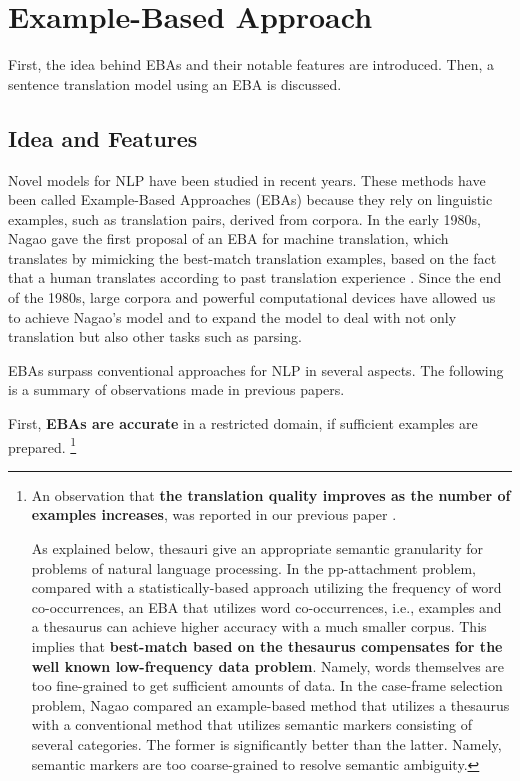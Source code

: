 \section{Example-Based Approach}\label{sec-outline}

First, the idea behind EBAs and their notable features are introduced. Then, 
a sentence translation model using an EBA is discussed.

\subsection{Idea and Features}\label{sec-feature}

Novel models for NLP have been studied in recent years.
These methods have been called Example-Based Approaches (EBAs)
because they rely
on linguistic examples, such as translation
pairs, derived from corpora.
In the early 1980s, Nagao gave the first proposal of an EBA
for machine translation, 
which  translates by mimicking 
the best-match translation examples,
based on the fact that  
a human translates according to
past translation experience \cite{Nagao84}.
Since the end of the 1980s, 
large corpora and powerful computational devices have allowed us to
achieve Nagao's model and to expand the model to deal with 
not only translation but also other tasks such as parsing.

EBAs surpass conventional approaches for NLP
in several aspects. 
The following is a summary of observations made in  previous papers.

First, {\bf EBAs are accurate} in a restricted domain, if sufficient examples
are prepared.
\footnote{
An observation that {\bf the translation quality improves as the number 
of examples increases}, was reported in our previous paper \cite{Sumita92b}.

As explained below, thesauri give an appropriate semantic granularity for 
problems of natural language processing.
In the pp-attachment problem, compared with a statistically-based approach 
utilizing the frequency of word co-occurrences, an EBA that utilizes 
word co-occurrences, i.e., examples and a thesaurus can achieve higher 
accuracy with a much smaller corpus.
This implies that {\bf best-match based on the thesaurus compensates for
the well known low-frequency data problem}. Namely, words themselves are too 
fine-grained to get sufficient amounts of data.
In the case-frame selection problem, Nagao \cite{Nagao92} compared 
an example-based method that utilizes a thesaurus with
a conventional method that utilizes semantic markers consisting of 
several categories. The former is significantly better than the latter.
Namely, semantic markers are too coarse-grained to resolve semantic ambiguity.}

